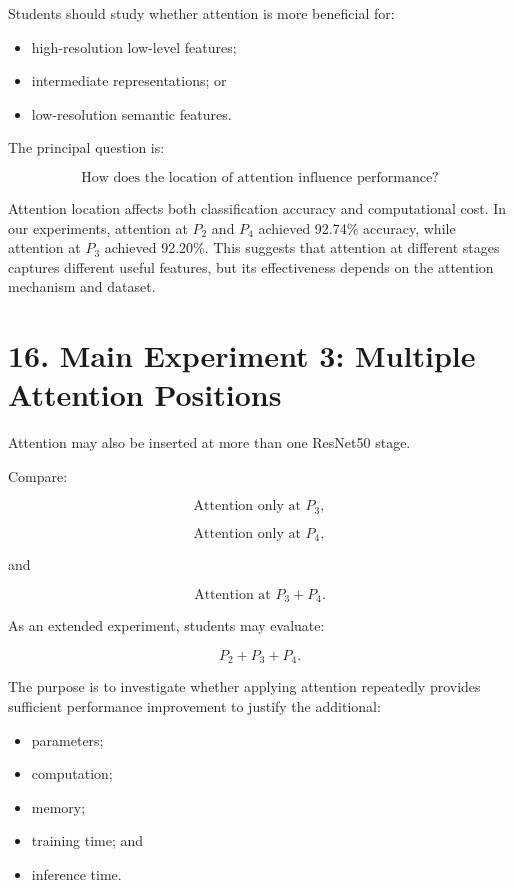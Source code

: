 \documentclass[10pt]{article}
\begin{document}
Students should study whether attention is more beneficial for:

\begin{itemize}

\item high-resolution low-level features;

\item intermediate representations; or

\item low-resolution semantic features.

\end{itemize}

The principal question is:

\[
\boxed{
\text{How does the location of attention influence performance?}
}
\]

Attention location affects both classification accuracy and computational cost.
In our experiments, attention at $P_2$ and $P_4$ achieved 92.74\%
accuracy, while attention at $P_3$ achieved 92.20\%.
This suggests that attention at different stages captures different useful
features, but its effectiveness depends on the attention mechanism and dataset.

\section*{16. Main Experiment 3: Multiple Attention Positions}

Attention may also be inserted at more than one ResNet50 stage.

Compare:

\[
\text{Attention only at }P_3,
\]

\[
\text{Attention only at }P_4,
\]

and

\[
\text{Attention at }P_3+P_4.
\]

As an extended experiment, students may evaluate:

\[
P_2+P_3+P_4.
\]

The purpose is to investigate whether applying attention repeatedly provides
sufficient performance improvement to justify the additional:

\begin{itemize}

\item parameters;

\item computation;

\item memory;

\item training time; and

\item inference time.

\end{itemize}
\end{document}
